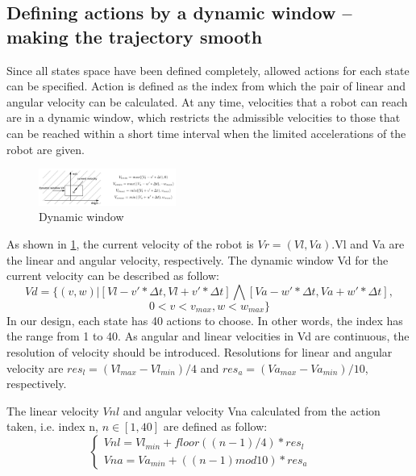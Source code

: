 \documentclass{acmtog} %
\begin{document}
	\subsection{Defining actions by a dynamic window -- making the trajectory smooth}
	Since all states space have been defined completely, allowed actions for each state can be specified.
	Action is defined as the index from which the pair of linear and angular velocity can be calculated.
	At any time, velocities that a robot can reach are in a dynamic window, which restricts the
	admissible velocities to those that can be reached within a short time interval when the limited
	accelerations of the robot are given.
	\begin{figure}[H]
		\centering
		\includegraphics[width=0.4\textwidth]{dym.PNG}
		\caption{Dynamic window}
		\label{dym}
	\end{figure}
	As shown in \ref{dym}, the current velocity of the robot is $Vr = (Vl ,Va )$.Vl and Va are the linear and
	angular velocity, respectively. The dynamic window Vd for the current velocity can be described as
	follow: $$Vd = \{(v,w) | [Vl-v'*\Delta t, Vl+v'*\Delta t] \bigwedge [Va-w'*\Delta t, Va+w'*\Delta t],$$ $$ 0< v < v_{max},w<w_{max} \}$$
	In our design, each state has 40 actions to choose. In other words, the index has the range from
	1 to 40. As angular and linear velocities in Vd are continuous, the resolution of velocity should
	be introduced. Resolutions for linear and angular velocity are $res_l = (Vl_{max} - Vl_{min} )/4$ and $res_a =
	(Va_{max} - Va_{min} )/10$, respectively.
	
	The linear velocity $Vnl$ and angular velocity Vna calculated from the action taken, i.e. index n, $n \in
	[1, 40]$ are defined as follow:
	\begin{equation}
	\label{act}
	\left\{
	\begin{array}{rcl}
	Vnl = Vl_{min} + floor((n-1)/4)*res_l & & {}\\
	Vna = Va_{min} + ((n-1)mod10)*res_a & & {}
	\end{array} \right.
	\end{equation}
	
\end{document}

